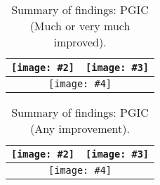 \documentclass{article}
\newcommand\soffignew[5]{

  \begin{table}
  \caption[SOF: #1]{Summary of findings: #5.}
             \label{tab:#1}
                 \begin{tabular}[width = \textwidth]{cc}
                 \hline
                 \texttt{[image: \#2]} &
                                \texttt{[image: \#3]}\\
                   \hline
                   \multicolumn{2}{c}{
                     \texttt{[image: \#4]}
                   }\\
                   \hline
                   \end{tabular}
                   \end{table}
                 }
\begin{document}
\soffignew{pgicmuch}{img/pgic_much_or_very_much_improved- - -post_int-net.png}{img/pgic_much_or_very_much_improved-pico.png}{img/pgic_much_or_very_much_improved-sof.png}{PGIC (Much or very much improved)}


\soffignew{pgicany}{img/pgic_any_improvement- - -post_int-net.png}{img/pgic_any_improvement-pico.png}{img/pgic_any_improvement-sof.png}{PGIC (Any improvement)}
\end{document}
